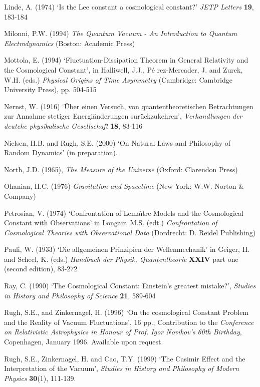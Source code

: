 \documentclass[12pt]{article}
\begin{document}
\begin{thebibliography}{X}
Linde, A. (1974) `Is the Lee constant a cosmological constant?'
{\em JETP Letters} {\bf 19}, 183-184

Milonni, P.W. (1994) {\em  The  Quantum   Vacuum -
An Introduction   to   Quantum
Electrodynamics} (Boston: Academic Press)

 Mottola, E. (1994) `Fluctuation-Dissipation
Theorem in General Relativity and the Cosmological Constant', in
Halliwell, J.J., P\' e rez-Mercader, J. and Zurek, W.H. (eds.)
{\em Physical Origins of Time Asymmetry} (Cambridge: Cambridge
University Press), pp. 504-515

Nernst, W. (1916) `\"{U}ber einen Versuch, von quantentheoretischen
Betrachtungen zur Annahme stetiger Energi\"{a}nderungen
sur\"{u}ckzukehren', {\em Verhandlungen der deutche physikalische 
Gesellschaft} {\bf 18}, 83-116  

Nielsen, H.B. and Rugh, S.E. (2000) `On Natural Laws and Philosophy of 
Random Dynamics' (in preparation).

 North, J.D. (1965), {\em The Measure of the Universe}
(Oxford: Clarendon Press)

 Ohanian, H.C. (1976) {\em Gravitation and Spacetime}
(New York: W.W. Norton \& Company)

Petrosian, V. (1974) `Confrontation of Lema\^ \i tre Models and the
Cosmological Constant with Observations' in Longair, M.S. (edt.)
{\em Confrontation of Cosmological Theories with Observational Data}
(Dordrecht: D. Reidel Publishing) 

 Pauli, W. (1933) `Die allgemeinen Prinzipien der 
Wellenmechanik'
in Geiger, H. and Scheel, K. (eds.) {\em Handbuch der Physik, Quantentheorie}
{\bf XXIV} part one (second edition), 83-272

 Ray, C. (1990) 
`The Cosmological Constant: Einstein's greatest mistake?', {\em
Studies in History and Philosophy of Science} {\bf 21}, 589-604

Rugh, S.E., and Zinkernagel, H. (1996) `On the cosmological Constant
Problem and the Reality of Vacuum Fluctuations', 16 pp.,
Contribution to the {\em Conference on Relativistic Astrophysics
in Honour of Prof. Igor Novikov's 60th Birthday}, Copenhagen,
January 1996. Available upon request.

Rugh, S.E., Zinkernagel, H. and Cao, T.Y. (1999) `The Casimir
Effect and the Interpretation of the Vacuum', {\em Studies in History
and Philosophy of Modern Physics} {\bf 30}(1), 111-139.


\end{thebibliography}
\end{document}
